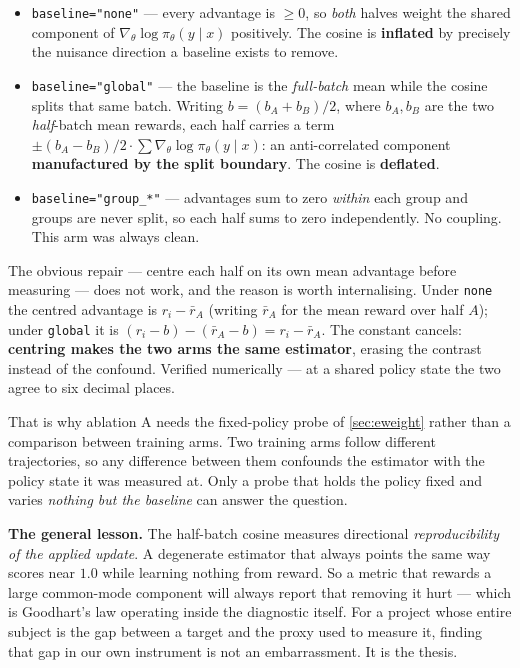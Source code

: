 \documentclass[11pt,letterpaper]{article}
\theoremstyle{definition}
\newcommand{\pol}{\pi_\theta}
\newcommand{\grad}{\nabla_\theta}
\newcommand{\score}{\grad \log \pol(y \mid x)}
\begin{document}
\begin{itemize}
  \item \texttt{baseline="none"} --- every advantage is $\ge 0$, so \emph{both} halves weight the
        shared component of $\score$ positively. The cosine is \textbf{inflated} by precisely the
        nuisance direction a baseline exists to remove.
  \item \texttt{baseline="global"} --- the baseline is the \emph{full-batch} mean while the cosine
        splits that same batch. Writing $b = (b_A + b_B)/2$, where $b_A, b_B$ are the two \emph{half}-batch mean rewards, each half carries
        a term $\pm (b_A - b_B)/2 \cdot \sum \score$: an anti-correlated component
        \textbf{manufactured by the split boundary}. The cosine is \textbf{deflated}.
  \item \texttt{baseline="group\_*"} --- advantages sum to zero \emph{within} each group and groups
        are never split, so each half sums to zero independently. No coupling. This arm was always
        clean.
\end{itemize}

The obvious repair --- centre each half on its own mean advantage before measuring --- does not work,
and the reason is worth internalising. Under \texttt{none} the centred advantage is
$r_i - \bar{r}_A$ (writing $\bar{r}_A$ for the mean reward over half $A$); under \texttt{global} it is $(r_i - b) - (\bar{r}_A - b) = r_i - \bar{r}_A$. The
constant cancels: \textbf{centring makes the two arms the same estimator}, erasing the contrast
instead of the confound. Verified numerically --- at a shared policy state the two agree to six
decimal places.

That is why ablation A needs the fixed-policy probe of \cref{sec:eweight} rather than a comparison
between training arms. Two training arms follow different trajectories, so any difference between them
confounds the estimator with the policy state it was measured at. Only a probe that holds the policy
fixed and varies \emph{nothing but the baseline} can answer the question.

\begin{aside}
\textbf{The general lesson.} The half-batch cosine measures directional \emph{reproducibility of the
applied update}. A degenerate estimator that always points the same way scores near $1.0$ while
learning nothing from reward. So a metric that rewards a large common-mode component will always
report that removing it hurt --- which is Goodhart's law operating inside the diagnostic itself. For a
project whose entire subject is the gap between a target and the proxy used to measure it, finding
that gap in our own instrument is not an embarrassment. It is the thesis.
\end{aside}
\end{document}
